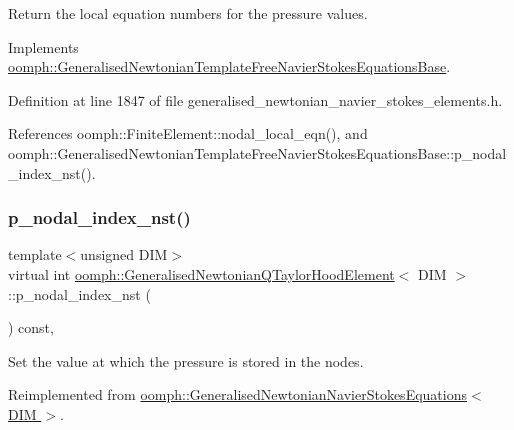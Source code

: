 Return the local equation numbers for the pressure values. 



Implements \hyperlink{classoomph_1_1GeneralisedNewtonianTemplateFreeNavierStokesEquationsBase_abacdc7add36a8da0b68b9f991e7973d9}{oomph\+::\+Generalised\+Newtonian\+Template\+Free\+Navier\+Stokes\+Equations\+Base}.



Definition at line 1847 of file generalised\+\_\+newtonian\+\_\+navier\+\_\+stokes\+\_\+elements.\+h.



References oomph\+::\+Finite\+Element\+::nodal\+\_\+local\+\_\+eqn(), and oomph\+::\+Generalised\+Newtonian\+Template\+Free\+Navier\+Stokes\+Equations\+Base\+::p\+\_\+nodal\+\_\+index\+\_\+nst().

\mbox{\label{classoomph_1_1GeneralisedNewtonianQTaylorHoodElement_a1100787d48487bdb1ca3201b49c9c41f}} 
\subsubsection{\texorpdfstring{p\+\_\+nodal\+\_\+index\+\_\+nst()}{p\_nodal\_index\_nst()}}
{\footnotesize\ttfamily template$<$unsigned D\+IM$>$ \\
virtual int \hyperlink{classoomph_1_1GeneralisedNewtonianQTaylorHoodElement}{oomph\+::\+Generalised\+Newtonian\+Q\+Taylor\+Hood\+Element}$<$ D\+IM $>$\+::p\+\_\+nodal\+\_\+index\+\_\+nst (\begin{DoxyParamCaption}{ }\end{DoxyParamCaption}) const\hspace{0.3cm}{\ttfamily [inline]}, {\ttfamily [virtual]}}



Set the value at which the pressure is stored in the nodes. 



Reimplemented from \hyperlink{classoomph_1_1GeneralisedNewtonianNavierStokesEquations_aae2c43cb69c84108e838b5aec8bd2a4b}{oomph\+::\+Generalised\+Newtonian\+Navier\+Stokes\+Equations$<$ D\+I\+M $>$}.




